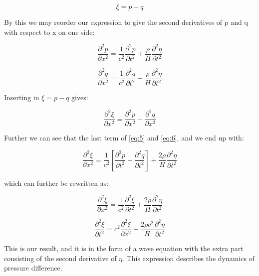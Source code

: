 \documentclass[twoside,twocolumn]{article}
\begin{document}
 \begin{equation}
\xi = p - q
\end{equation}

By this we may reorder our expression to give the second derivatives of p and q with respect to x on one side: 

 \begin{equation}\label{eq:5}
\frac{\partial^2 p}{\partial x^2} =  \frac{1}{c^2}\frac{\partial^2 p}{\partial t^2}    + \frac{\rho}{H} \frac{\partial^2 \eta}{\partial t^2}
\end{equation}

 \begin{equation}\label{eq:6}
\frac{\partial^2 q}{\partial x^2} =  \frac{1}{c^2}\frac{\partial^2 q}{\partial t^2}    - \frac{\rho}{H} \frac{\partial^2 \eta}{\partial t^2}
\end{equation}

Inserting in $\xi = p - q$ gives: 

 \begin{equation}
\frac{\partial^2 \xi}{\partial x^2} = \frac{\partial^2 p}{\partial x^2} - \frac{\partial^2 q}{\partial x^2} 
\end{equation}

Further we can see that the last term of \ref{eq:5} and \ref{eq:6}, and we end up with: 

 \begin{equation}
\frac{\partial^2 \xi}{\partial x^2} = \frac{1}{c^2}\left [\frac{\partial^2 p}{\partial t^2} -\frac{\partial^2 q}{\partial t^2} \right] +  \frac{2\rho}{H} \frac{\partial^2 \eta}{\partial t^2}
\end{equation}

which can further be rewritten as: 

 \begin{equation}
\frac{\partial^2 \xi}{\partial x^2} = \frac{1}{c^2} \frac{\partial^2 \xi}{\partial t^2} +  \frac{2\rho}{H} \frac{\partial^2 \eta}{\partial t^2}
\end{equation}

 \begin{equation}
\frac{\partial^2 \xi}{\partial t^2}  = c^2\frac{\partial^2 \xi}{\partial x^2} +  \frac{2\rho c^2}{H} \frac{\partial^2 \eta}{\partial t^2}
\end{equation}


This is our result, and it is in the form of a wave equation with the extra part consisting of the second derivative of $\eta$. This expression describes the dynamics of pressure difference. 
\end{document}
